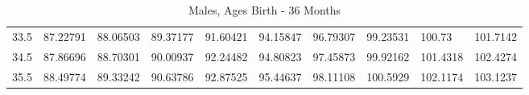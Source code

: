 \documentclass[10pt,twocolumn,letterpaper]{article}
\begin{document}
\begin{table}
\begin{tabular}{llllllllll}
    33.5            & 87.22791                               & 88.06503                               & 89.37177                                & 91.60421                                & 94.15847                                & 96.79307                                & 99.23531                                & 100.73                                  & 101.7142                                \\
    34.5            & 87.86696                               & 88.70301                               & 90.00937                                & 92.24482                                & 94.80823                                & 97.45873                                & 99.92162                                & 101.4318                                & 102.4274                                \\
    35.5            & 88.49774                               & 89.33242                               & 90.63786                                & 92.87525                                & 95.44637                                & 98.11108                                & 100.5929                                & 102.1174                                & 103.1237                                \\
    \end{tabular}
		
    \caption {Males, Ages Birth - $36$ Months}
\end{table}
\end{document}
